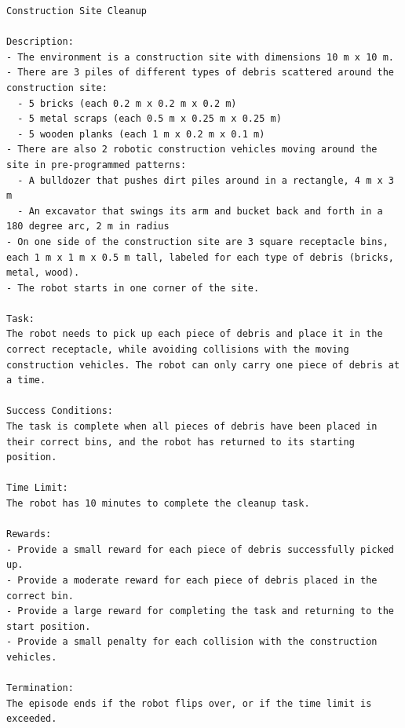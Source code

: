 \begin{lstlisting}[language={}]
Construction Site Cleanup

Description: 
- The environment is a construction site with dimensions 10 m x 10 m.
- There are 3 piles of different types of debris scattered around the construction site:
  - 5 bricks (each 0.2 m x 0.2 m x 0.2 m)
  - 5 metal scraps (each 0.5 m x 0.25 m x 0.25 m) 
  - 5 wooden planks (each 1 m x 0.2 m x 0.1 m)
- There are also 2 robotic construction vehicles moving around the site in pre-programmed patterns:
  - A bulldozer that pushes dirt piles around in a rectangle, 4 m x 3 m
  - An excavator that swings its arm and bucket back and forth in a 180 degree arc, 2 m in radius
- On one side of the construction site are 3 square receptacle bins, each 1 m x 1 m x 0.5 m tall, labeled for each type of debris (bricks, metal, wood).
- The robot starts in one corner of the site.

Task:
The robot needs to pick up each piece of debris and place it in the correct receptacle, while avoiding collisions with the moving construction vehicles. The robot can only carry one piece of debris at a time.

Success Conditions:
The task is complete when all pieces of debris have been placed in their correct bins, and the robot has returned to its starting position.

Time Limit:
The robot has 10 minutes to complete the cleanup task.

Rewards:
- Provide a small reward for each piece of debris successfully picked up.
- Provide a moderate reward for each piece of debris placed in the correct bin.
- Provide a large reward for completing the task and returning to the start position.
- Provide a small penalty for each collision with the construction vehicles.

Termination:
The episode ends if the robot flips over, or if the time limit is exceeded.
\end{lstlisting}

